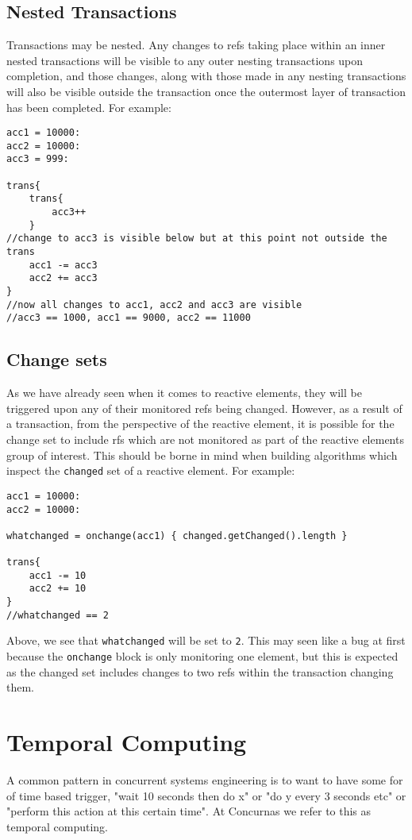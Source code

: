 \documentclass[conc-doc]{subfiles}
\begin{document}
\subsection{Nested Transactions}
Transactions may be nested. Any changes to refs taking place within an inner nested transactions will be visible to any outer nesting transactions upon completion, and those changes, along with those made in any nesting transactions will also be visible outside the transaction once the outermost layer of transaction has been completed. For example:

\begin{lstlisting}
acc1 = 10000:
acc2 = 10000:
acc3 = 999:

trans{
	trans{
		acc3++
	}
//change to acc3 is visible below but at this point not outside the trans
	acc1 -= acc3
	acc2 += acc3
}
//now all changes to acc1, acc2 and acc3 are visible
//acc3 == 1000, acc1 == 9000, acc2 == 11000
\end{lstlisting}

\subsection{Change sets}
As we have already seen when it comes to reactive elements, they will be triggered upon any of their monitored refs being changed. However, as a result of a transaction, from the perspective of the reactive element, it is possible for the change set to include rfs which are not monitored as part of the reactive elements group of interest. This should be borne in mind when building algorithms which inspect the \lstinline{changed} set of a reactive element. For example:


\begin{lstlisting}
acc1 = 10000:
acc2 = 10000:

whatchanged = onchange(acc1) { changed.getChanged().length }

trans{
	acc1 -= 10
	acc2 += 10
}
//whatchanged == 2
\end{lstlisting}

Above, we see that \lstinline{whatchanged} will be set to \lstinline{2}. This may seen like a bug at first because the \lstinline{onchange} block is only monitoring one element, but this is expected as the changed set includes changes to two refs within the transaction changing them.

\section{Temporal Computing}
A common pattern in concurrent systems engineering is to want to have some for of time based trigger, "wait 10 seconds then do x" or "do y every 3 seconds etc" or "perform this action at this certain time". At Concurnas we refer to this as temporal computing.
\end{document}
